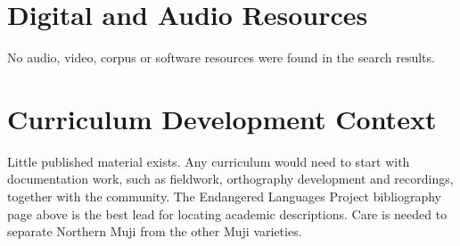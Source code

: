 \documentclass[12pt]{article}
\begin{document}
\section{Digital and Audio Resources}
No audio, video, corpus or software resources were found in the search results.

\section{Curriculum Development Context}
Little published material exists. Any curriculum would need to start with documentation work, such as fieldwork, orthography development and recordings, together with the community. The Endangered Languages Project bibliography page above is the best lead for locating academic descriptions. Care is needed to separate Northern Muji from the other Muji varieties.
\end{document}
